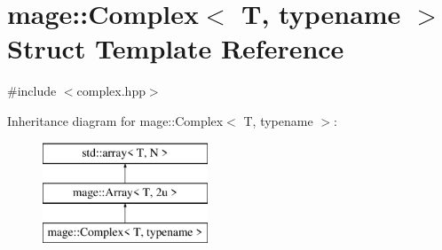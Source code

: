 \hypertarget{structmage_1_1_complex}{}\section{mage\+:\+:Complex$<$ T, typename $>$ Struct Template Reference}
\label{structmage_1_1_complex}


{\ttfamily \#include $<$complex.\+hpp$>$}

Inheritance diagram for mage\+:\+:Complex$<$ T, typename $>$\+:\begin{figure}[H]
\begin{center}
\leavevmode
\includegraphics[height=3.000000cm]{structmage_1_1_complex}
\end{center}
\end{figure}
